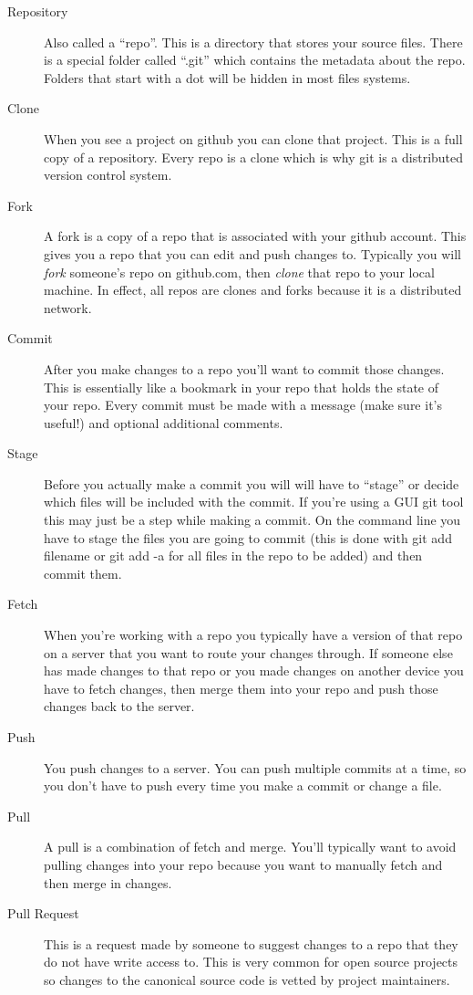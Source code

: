\begin{description}
	\item[Repository] Also called a ``repo''. This is a directory that stores your source files. There is a special folder called ``.git'' which contains the metadata about the repo. Folders that start with a dot will be hidden in most files systems.
	\item[Clone] When you see a project on github you can clone that project. This is a full copy of a repository. Every repo is a clone which is why git is a distributed version control system.
	\item[Fork] A fork is a copy of a repo that is associated with your github account. This gives you a repo that you can edit and push changes to. Typically you will \textit{fork} someone's repo on github.com, then \textit{clone} that repo to your local machine. In effect, all repos are clones and forks because it is a distributed network.
	\item[Commit] After you make changes to a repo you'll want to commit those changes. This is essentially like a bookmark in your repo that holds the state of your repo. Every commit must be made with a message (make sure it's useful!) and optional additional comments.
	\item[Stage] Before you actually make a commit you will will have to ``stage'' or decide which files will be included with the commit. If you're using a GUI git tool this may just be a step while making a commit. On the command line you have to stage the files you are going to commit (this is done with git add filename or git add -a for all files in the repo to be added) and then commit them.
	\item[Fetch] When you're working with a repo you typically have a version of that repo on a server that you want to route your changes through. If someone else has made changes to that repo or you made changes on another device you have to fetch changes, then merge them into your repo and push those changes back to the server.
	\item[Push] You push changes to a server. You can push multiple commits at a time, so you don't have to push every time you make a commit or change a file.
	\item[Pull] A pull is a combination of fetch and merge. You'll typically want to avoid pulling changes into your repo because you want to manually fetch and then merge in changes.
	\item[Pull Request] This is a request made by someone to suggest changes to a repo that they do not have write access to. This is very common for open source projects so changes to the canonical source code is vetted by project maintainers.

\end{description}
